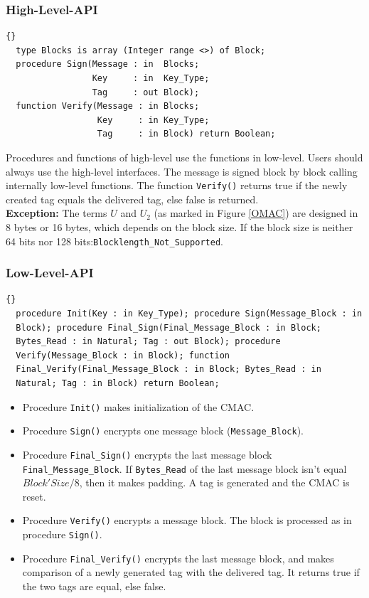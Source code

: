 \subsubsection*{High-Level-API}
\begin{lstlisting}{}
  type Blocks is array (Integer range <>) of Block;
  procedure Sign(Message : in  Blocks;
                 Key     : in  Key_Type;
                 Tag     : out Block);
  function Verify(Message : in Blocks;
                  Key     : in Key_Type;
                  Tag     : in Block) return Boolean;
\end{lstlisting}
Procedures and functions of high-level use the functions in
low-level. Users should always use the high-level interfaces. The
message is signed block by block calling internally low-level
functions. The function \texttt{Verify()} returns true if the newly
created tag equals the delivered tag, else false is
returned.\\

\noindent\textbf{Exception:} The terms $U$ and $U_2$ (as marked in
Figure \ref{OMAC}) are designed in 8 bytes or 16 bytes, which depends
on the block size. If the block size is neither 64 bits nor 128
bits:\quad\texttt{Blocklength\_Not\_Supported}.

\subsubsection*{Low-Level-API}
\begin{lstlisting}{}
  procedure Init(Key : in Key_Type); procedure Sign(Message_Block : in
  Block); procedure Final_Sign(Final_Message_Block : in Block;
  Bytes_Read : in Natural; Tag : out Block); procedure
  Verify(Message_Block : in Block); function
  Final_Verify(Final_Message_Block : in Block; Bytes_Read : in
  Natural; Tag : in Block) return Boolean;
\end{lstlisting}
\begin{itemize}
\item Procedure \texttt{Init()} makes initialization of the CMAC.
\item Procedure \texttt{Sign()} encrypts one message block
  (\texttt{Message\_Block}).
\item Procedure \texttt{Final\_Sign()} encrypts the last message block
  \texttt{Final\_Message\_Block}. If \texttt{Bytes\_Read} of the last
  message block isn't equal $Block'Size/8$, then it makes padding. A
  tag is generated and the CMAC is reset.
\item Procedure \texttt{Verify()} encrypts a message block. The block
  is processed as in procedure \texttt{Sign()}.
\item Procedure \texttt{Final\_Verify()} encrypts the last message
  block, and makes comparison of a newly generated tag with the
  delivered tag. It returns true if the two tags are equal, else
  false.
\end{itemize}

